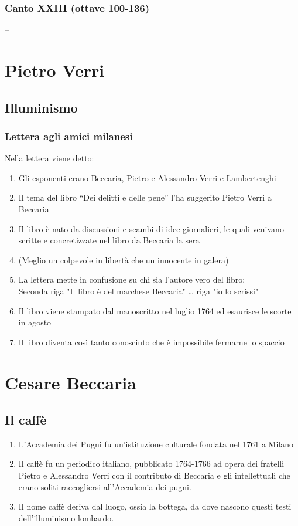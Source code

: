 \documentclass{article}
\begin{document}
\newpage
\subsubsection{Canto XXIII (ottave 100-136)}

--

\newpage
\section{Pietro Verri}
\subsection{Illuminismo}
\subsubsection{Lettera agli amici milanesi}
Nella lettera viene detto:
\begin{enumerate}
    \item Gli esponenti erano Beccaria, Pietro e Alessandro Verri e Lambertenghi
    \item Il tema del libro ``Dei delitti e delle pene'' l'ha suggerito Pietro Verri a Beccaria
    \item Il libro è nato da discussioni e scambi di idee giornalieri, le quali venivano 
    scritte e concretizzate nel libro da Beccaria la sera
    \item (Meglio un colpevole in libertà che un innocente in galera)
    \item La lettera mette in confusione su chi sia l'autore vero del libro:\\
    Seconda riga "Il libro è del marchese Beccaria"
    … riga "io lo scrissi"
    \item Il libro viene stampato dal manoscritto nel luglio 1764 ed esaurisce le scorte 
    in agosto
    \item Il libro diventa così tanto conosciuto che è impossibile fermarne lo spaccio
\end{enumerate}

\newpage
\section{Cesare Beccaria}

\subsection{Il caffè}

\begin{enumerate}
    \item L'Accademia dei Pugni fu un'istituzione culturale fondata nel 1761 a Milano
    \item Il caffè fu un periodico italiano, pubblicato 1764-1766 ad opera dei fratelli Pietro e Alessandro Verri con il contributo di Beccaria e gli intellettuali che erano soliti raccogliersi all'Accademia dei pugni.
    \item Il nome caffè deriva dal luogo, ossia la bottega, da dove nascono questi testi dell'illuminismo lombardo.
\end{enumerate}
\end{document}
